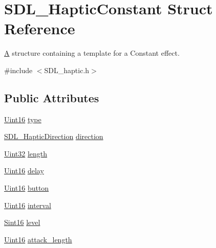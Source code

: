 \hypertarget{struct_s_d_l___haptic_constant}{}\section{S\+D\+L\+\_\+\+Haptic\+Constant Struct Reference}
\label{struct_s_d_l___haptic_constant}


\mbox{\hyperlink{struct_a}{A}} structure containing a template for a Constant effect.  




{\ttfamily \#include $<$S\+D\+L\+\_\+haptic.\+h$>$}

\subsection*{Public Attributes}
\begin{DoxyCompactItemize}
\item 
\mbox{\hyperlink{_s_d_l__stdinc_8h_a31fcc0a076c9068668173ee26d33e42b}{Uint16}} \mbox{\hyperlink{struct_s_d_l___haptic_constant_a5cb31202803a8bc1be95fcede5ac8afb}{type}}
\item 
\mbox{\hyperlink{struct_s_d_l___haptic_direction}{S\+D\+L\+\_\+\+Haptic\+Direction}} \mbox{\hyperlink{struct_s_d_l___haptic_constant_a3e871debf4e57c35960f019d2605d84f}{direction}}
\item 
\mbox{\hyperlink{_s_d_l__stdinc_8h_add440eff171ea5f55cb00c4a9ab8672d}{Uint32}} \mbox{\hyperlink{struct_s_d_l___haptic_constant_aeb994c356b1d236b060f277d157e98ec}{length}}
\item 
\mbox{\hyperlink{_s_d_l__stdinc_8h_a31fcc0a076c9068668173ee26d33e42b}{Uint16}} \mbox{\hyperlink{struct_s_d_l___haptic_constant_a16a751009893f5412201e3ce91146b25}{delay}}
\item 
\mbox{\hyperlink{_s_d_l__stdinc_8h_a31fcc0a076c9068668173ee26d33e42b}{Uint16}} \mbox{\hyperlink{struct_s_d_l___haptic_constant_aa65321f1b002adaab6e629d5bed556e9}{button}}
\item 
\mbox{\hyperlink{_s_d_l__stdinc_8h_a31fcc0a076c9068668173ee26d33e42b}{Uint16}} \mbox{\hyperlink{struct_s_d_l___haptic_constant_ab1f7f0df856f4cf1fdf937cb886226b4}{interval}}
\item 
\mbox{\hyperlink{_s_d_l__stdinc_8h_a9d0257032c0e146ab6121bf0122712f5}{Sint16}} \mbox{\hyperlink{struct_s_d_l___haptic_constant_a5b095eea77464623ed57af15f29f4ca6}{level}}
\item 
\mbox{\hyperlink{_s_d_l__stdinc_8h_a31fcc0a076c9068668173ee26d33e42b}{Uint16}} \mbox{\hyperlink{struct_s_d_l___haptic_constant_a907bade68ab53fb24e7d2651d19b767f}{attack\+\_\+length}}

\end{DoxyCompactItemize}
